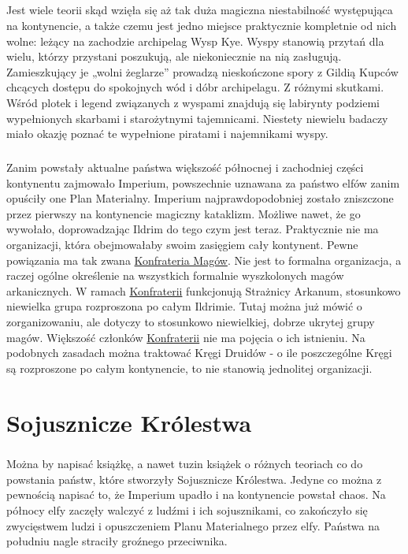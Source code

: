 \paragraph{}
Jest wiele teorii skąd wzięła się aż tak duża magiczna niestabilność występująca na kontynencie, a także czemu jest jedno miejsce praktycznie kompletnie od nich wolne: leżący na zachodzie archipelag Wysp Kye.
Wyspy stanowią przytań dla wielu, którzy przystani poszukują, ale niekoniecznie na nią zasługują.
Zamieszkujący je „wolni żeglarze” prowadzą nieskończone spory z Gildią Kupców chcących dostępu do spokojnych wód i dóbr archipelagu.
Z różnymi skutkami.
Wśród plotek i legend związanych z wyspami znajdują się labirynty podziemi wypełnionych skarbami i starożytnymi tajemnicami.
Niestety niewielu badaczy miało okazję poznać te wypełnione piratami i najemnikami wyspy.

\paragraph{}
Zanim powstały aktualne państwa większość północnej i zachodniej części kontynentu zajmowało Imperium, powszechnie uznawana za państwo elfów zanim opuściły one Plan Materialny.
Imperium najprawdopodobniej zostało zniszczone przez pierwszy na kontynencie magiczny kataklizm.
Możliwe nawet, że go wywołało, doprowadzając Ildrim do tego czym jest teraz.
Praktycznie nie ma organizacji, która obejmowałaby swoim zasięgiem cały kontynent.
Pewne powiązania ma tak zwana \hyperref[KonfrateriaMagow]{Konfrateria Magów}.
Nie jest to formalna organizacja, a raczej ogólne określenie na wszystkich formalnie wyszkolonych magów arkanicznych.
W ramach \hyperref[KonfrateriaMagow]{Konfraterii} funkcjonują Strażnicy Arkanum, stosunkowo niewielka grupa rozproszona po całym Ildrimie.
Tutaj można już mówić o zorganizowaniu, ale dotyczy to stosunkowo niewielkiej, dobrze ukrytej grupy magów.
Większość członków \hyperref[KonfrateriaMagow]{Konfraterii} nie ma pojęcia o ich istnieniu.
Na podobnych zasadach można traktować Kręgi Druidów -  o ile poszczególne Kręgi są rozproszone po całym kontynencie, to nie stanowią jednolitej organizacji.

\label{SojuszniczeKrolestwa}
\chapter{Sojusznicze Królestwa}

\paragraph{}
Można by napisać książkę, a nawet tuzin książek o różnych teoriach co do powstania państw, które stworzyły Sojusznicze Królestwa.
Jedyne co można z pewnością napisać to, że Imperium upadło i na kontynencie powstał chaos.
Na północy elfy zaczęły walczyć z ludźmi i ich sojusznikami, co zakończyło się zwycięstwem ludzi i opuszczeniem Planu Materialnego przez elfy.
Państwa na południu nagle straciły groźnego przeciwnika.

